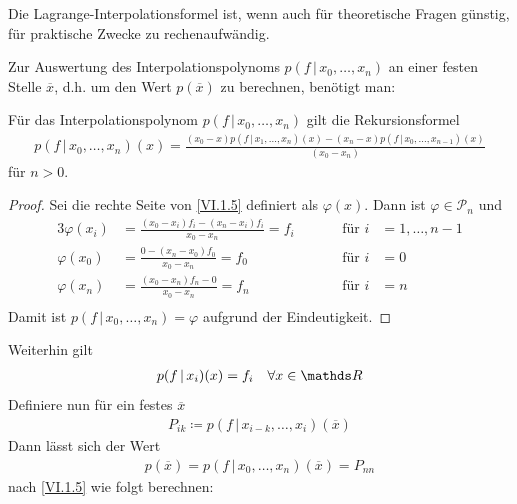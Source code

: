 Die Lagrange-Interpolationsformel ist,
wenn auch für theoretische Fragen günstig,
für praktische Zwecke zu rechenaufwändig.

Zur Auswertung des Interpolationspolynoms $p(f\,|\,x_0,\dots, x_n)$
an einer festen Stelle $\overline{x}$, d.h.
um den Wert $p(\overline{x} ) $ zu berechnen,
benötigt man:

\begin{Leme}
  Für das Interpolationspolynom $p(f\,|\,x_0, \dots, x_n)$ gilt die 
  Rekursionsformel
  \begin{gather}
    p(f\,|\,x_0, \dots, x_n) (x) = \frac{(x_0-x)p(f\,|\,x_1,\dots, x_n)(x) -
      (x_n-x)p(f\,|\,x_0,\dots, x_{n-1})(x)}
    {(x_0-x_n)}
    \label{VI.1.5}
  \end{gather}
  für $n>0$.	
\end{Leme}

\begin{proof}
  Sei die rechte Seite von \eqref{VI.1.5} definiert als $\varphi(x)$.
  Dann ist $\varphi\in\mathcal{P}_n$ und 
  \begin{alignat*}{3}
    \varphi(x_i) &= \frac{(x_0-x_i)f_i-(x_n-x_i)f_i}{x_0-x_n}= f_i\quad
    &&&\text{für } i&=1,\dots , n-1\\
    \varphi(x_0) &= \frac{0-(x_n-x_0)f_0}{x_0-x_n} = f_0
    &&&\text{für } i&=0\\
    \varphi(x_n) &= \frac{(x_0-x_n)f_n-0}{x_0-x_n} = f_n
    &&&\text{für } i&=n\\
  \end{alignat*}
  Damit ist $p(f\,|\,x_0, \dots, x_n) = \varphi$ aufgrund der Eindeutigkeit.
\end{proof}



Weiterhin gilt
\begin{gather}
  p(f\,|\, x_i)(x) = f_i\quad \forall x\in\R
  \label{VI.1.6}
\end{gather}
Definiere nun für ein festes $\overline{x}$
\begin{gather}
  P_{ik} \coloneqq p(f\,|\, x_{i-k}, \dots, x_{i})(\overline{x})
  \label{VI.1.7}
\end{gather}
Dann lässt sich der Wert
\begin{gather*}
  p(\overline{x}) = p(f\,|\, x_0, \dots , x_n)(\overline{x})= P_{nn}
\end{gather*}
nach \eqref{VI.1.5} wie folgt berechnen:


